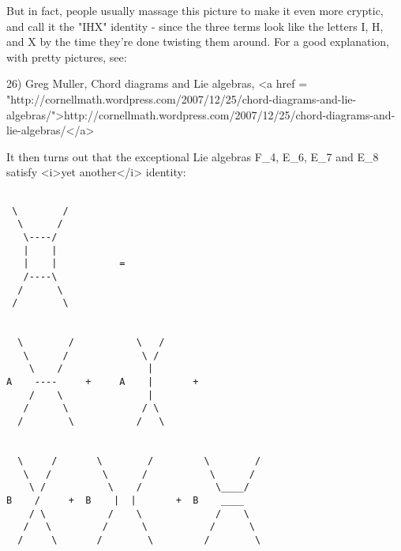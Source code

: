 But in fact, people usually massage this picture to make it even
more cryptic, and call it the "IHX" identity - since the three terms
look like the letters I, H, and X by the time they're done twisting
them around.  For a good explanation, with pretty pictures, see:

26) Greg Muller, Chord diagrams and Lie algebras, 
<a href = "http://cornellmath.wordpress.com/2007/12/25/chord-diagrams-and-lie-algebras/">http://cornellmath.wordpress.com/2007/12/25/chord-diagrams-and-lie-algebras/</a>
 
It then turns out that the exceptional Lie algebras 
F_{4}, E_{6}, E_{7} and E_{8} satisfy 
<i>yet another</i> identity:


\begin{verbatim}

 \        /                
  \      /                
   \----/                
   |    |                       
   |    |           = 
   /----\            
  /      \          
 /        \                
                       
 
  \        /           \   /
   \      /             \ /   
    \    /               |   
A    ----     +     A    |       +
    /    \               |  
   /      \             / \  
  /        \           /   \  


  \     /       \        /         \        /
   \   /         \      /           \      /
    \ /           \    /             \____/ 
B    /     +  B    |  |       +  B    ____    
    / \           /    \             /    \
   /   \         /      \           /      \
  /     \       /        \         /        \
\end{verbatim}
    




